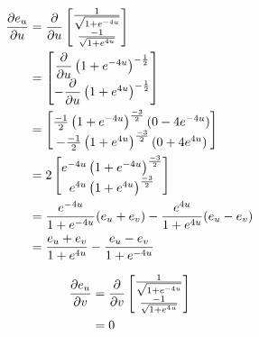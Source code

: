 \documentclass[a4paper, 11pt]{article}
\begin{document}
\begin{enumerate}[label=(\alph*)]
        \begin{mdframed}
          \begin{minipage}[t]{0.5\textwidth}
            \begin{align*}
              \dfrac{\partial e_u}{\partial u} & = \dfrac{\partial}{\partial u}\begin{bmatrix}
                                    \frac{1}{\sqrt{1 + e^{-4u}}} \\
                                    \frac{-1}{\sqrt{1 + e^{4u}}}
                                  \end{bmatrix}                       \\
                        & = \begin{bmatrix}
                              \dfrac{\partial}{\partial u}\left( 1 + e^{-4u} \right)^{-\frac 12} \\
                              -\dfrac{\partial}{\partial u}\left(1 + e^{4u} \right)^{-\frac 12}
                            \end{bmatrix}                 \\
                        & =  \begin{bmatrix}
                               \frac{-1}2\left( 1+e^{-4u} \right)^{\frac{-3}2}(0-4e^{-4u}) \\
                               -\frac{-1}2\left( 1+e^{4u} \right)^{\frac{-3}2}(0+4e^{4u})
                             \end{bmatrix} \\
                        & =  2\begin{bmatrix}
                                e^{-4u}\left( 1+e^{-4u} \right)^{\frac{-3}2} \\
                                e^{4u}\left( 1+e^{4u} \right)^{\frac{-3}2}
                              \end{bmatrix}               \\
                        & =
              \frac{e^{-4u}}{
              1+e^{-4u}
              }(e_u+e_v)
              -\frac{e^{4u}}{1+e^{4u}}(e_u-e_v)                                          \\
                        & =
              \frac{e_u+e_v}{
              1+e^{4u}
              }
              -\frac{e_u-e_v}{1+e^{-4u}}
            \end{align*}
          \end{minipage}\begin{minipage}[t]{0.5\textwidth}
            \begin{align*}
              \dfrac{\partial e_u}{\partial v} & = \dfrac{\partial}{\partial v}\begin{bmatrix}
                                    \frac{1}{\sqrt{1 + e^{-4u}}} \\
                                    \frac{-1}{\sqrt{1 + e^{4u}}}
                                  \end{bmatrix} \\
                        & = 0
            \end{align*}
          \end{minipage}


\end{mdframed}
\end{enumerate}
\end{document}
